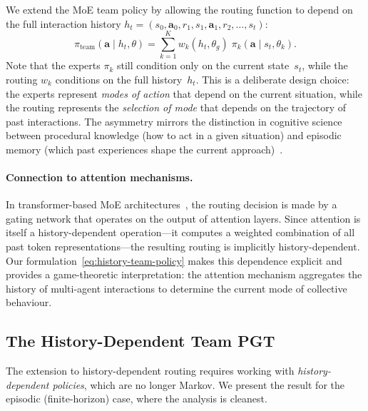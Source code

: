 We extend the MoE team policy by allowing the routing function to depend on the full interaction history $h_t = (s_0,\bm{a}_0,r_1,s_1,\bm{a}_1,r_2,\ldots,s_t)$:
\begin{equation}\label{eq:history-team-policy}
  \pi_{\mathrm{team}}(\bm{a}\mid h_t,\theta) = \sum_{k=1}^K w_k(h_t,\theta_g)\;\pi_k(\bm{a}\mid s_t,\theta_k).
\end{equation}
Note that the experts $\pi_k$ still condition only on the current state~$s_t$, while the routing $w_k$ conditions on the full history~$h_t$. This is a deliberate design choice: the experts represent \emph{modes of action} that depend on the current situation, while the routing represents the \emph{selection of mode} that depends on the trajectory of past interactions. The asymmetry mirrors the distinction in cognitive science between procedural knowledge (how to act in a given situation) and episodic memory (which past experiences shape the current approach)~\cite{tulving1972}.

\paragraph{Connection to attention mechanisms.} In transformer-based MoE architectures~\cite{deepseekv3}, the routing decision is made by a gating network that operates on the output of attention layers. Since attention is itself a history-dependent operation---it computes a weighted combination of all past token representations---the resulting routing is implicitly history-dependent. Our formulation~\eqref{eq:history-team-policy} makes this dependence explicit and provides a game-theoretic interpretation: the attention mechanism aggregates the history of multi-agent interactions to determine the current mode of collective behaviour.

\subsection{The History-Dependent Team PGT}
\label{subsec:history-team-pgt}

The extension to history-dependent routing requires working with \emph{history-dependent policies}, which are no longer Markov. We present the result for the episodic (finite-horizon) case, where the analysis is cleanest.

